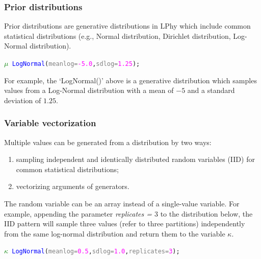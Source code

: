 \documentclass[10pt,letterpaper,table]{article}
\begin{document}
\subsubsection{Prior distributions}
Prior distributions are generative distributions in LPhy which include common statistical distributions (e.g., Normal distribution, Dirichlet distribution, Log-Normal distribution).  


{\small
\begin{alltt}
  \textcolor{green}{\(\mu\)} ~ \textcolor{blue}{LogNormal}(\textcolor{gray}{meanlog=}\textcolor{magenta}{-5.0}, \textcolor{gray}{sdlog=}\textcolor{magenta}{1.25});
\end{alltt}

For example, the `LogNormal()' above is a generative distribution which samples values from a Log-Normal distribution with a mean of $-5$ and a standard deviation of $1.25$. 
}


\subsubsection{Variable vectorization}

Multiple values can be generated from a distribution by two ways:

\begin{enumerate}
    \item sampling independent and identically distributed random variables (IID) for common statistical distributions;
    \item vectorizing arguments of generators.
\end{enumerate}

The random variable can be an array instead of a single-value variable. For example, appending the parameter \textit{replicates = $3$} to the distribution below, the IID pattern will sample three values (refer to three partitions) independently from the same log-normal distribution and return them to the variable $\kappa$.

{\small
\begin{alltt}
  \textcolor{green}{\(\kappa\)} ~ \textcolor{blue}{LogNormal}(\textcolor{gray}{meanlog=}\textcolor{magenta}{0.5}, \textcolor{gray}{sdlog=}\textcolor{magenta}{1.0}, \textcolor{gray}{replicates=}\textcolor{magenta}{3});
\end{alltt}
}
\end{document}
